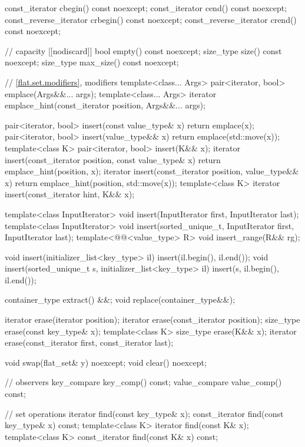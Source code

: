 \begin{codeblock}
{{    const_iterator         cbegin() const noexcept;
    const_iterator         cend() const noexcept;
    const_reverse_iterator crbegin() const noexcept;
    const_reverse_iterator crend() const noexcept;

    // capacity
    [[nodiscard]] bool empty() const noexcept;
    size_type size() const noexcept;
    size_type max_size() const noexcept;

    // \ref{flat.set.modifiers}, modifiers
    template<class... Args> pair<iterator, bool> emplace(Args&&... args);
    template<class... Args>
      iterator emplace_hint(const_iterator position, Args&&... args);

    pair<iterator, bool> insert(const value_type& x)
      { return emplace(x); }
    pair<iterator, bool> insert(value_type&& x)
      { return emplace(std::move(x)); }
    template<class K> pair<iterator, bool> insert(K&& x);
    iterator insert(const_iterator position, const value_type& x)
      { return emplace_hint(position, x); }
    iterator insert(const_iterator position, value_type&& x)
      { return emplace_hint(position, std::move(x)); }
    template<class K> iterator insert(const_iterator hint, K&& x);

    template<class InputIterator>
      void insert(InputIterator first, InputIterator last);
    template<class InputIterator>
      void insert(sorted_unique_t, InputIterator first, InputIterator last);
    template<@@<value_type> R>
      void insert_range(R&& rg);

    void insert(initializer_list<key_type> il)
      { insert(il.begin(), il.end()); }
    void insert(sorted_unique_t s, initializer_list<key_type> il)
      { insert(s, il.begin(), il.end()); }

    container_type extract() &&;
    void replace(container_type&&);

    iterator erase(iterator position);
    iterator erase(const_iterator position);
    size_type erase(const key_type& x);
    template<class K> size_type erase(K&& x);
    iterator erase(const_iterator first, const_iterator last);

    void swap(flat_set& y) noexcept;
    void clear() noexcept;

    // observers
    key_compare key_comp() const;
    value_compare value_comp() const;

    // set operations
    iterator find(const key_type& x);
    const_iterator find(const key_type& x) const;
    template<class K> iterator find(const K& x);
    template<class K> const_iterator find(const K& x) const;

}}
\end{codeblock}
